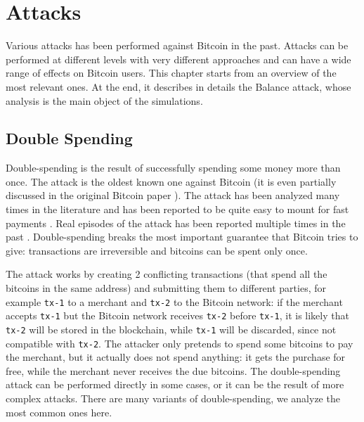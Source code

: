 \chapter{Attacks}
\label{chapter:attacks}
Various attacks has been performed against Bitcoin in the past.
Attacks can be performed at different levels with very different approaches and can have a wide range of effects on Bitcoin users.
This chapter starts from an overview of the most relevant ones.
At the end, it describes in details the Balance attack, whose analysis is the main object of the simulations.

\section{Double Spending}
Double-spending is the result of successfully spending some money more than once.
The attack is the oldest known one against Bitcoin (it is even partially discussed in the original Bitcoin paper \cite{bitcoin_2009}).
The attack has been analyzed many times in the literature \cite{double_spending_fast_payments, double_spending_two_for_one, double_spending_bitcoin_economics, double_spending_fast_analysis_2014} and has been reported to be quite easy to mount for fast payments \cite{double_spending_fast_payments}.
Real episodes of the attack has been reported multiple times in the past \cite{double_spending_ghash, double_spending_stackexchange}.
Double-spending breaks the most important guarantee that Bitcoin tries to give:
transactions are irreversible and bitcoins can be spent only once.

The attack works by creating \num{2} conflicting transactions (that spend all the bitcoins in the same address) and submitting them to different parties, for example \texttt{tx-1} to a merchant and \texttt{tx-2} to the Bitcoin network:
if the merchant accepts \texttt{tx-1} but the Bitcoin network receives \texttt{tx-2} before \texttt{tx-1}, it is likely that \texttt{tx-2} will be stored in the blockchain, while \texttt{tx-1} will be discarded, since not compatible with \texttt{tx-2}.
The attacker only pretends to spend some bitcoins to pay the merchant, but it actually does not spend anything:
it gets the purchase for free, while the merchant never receives the due bitcoins.
The double-spending attack can be performed directly in some cases, or it can be the result of more complex attacks.
There are many variants of double-spending, we analyze the most common ones here.


